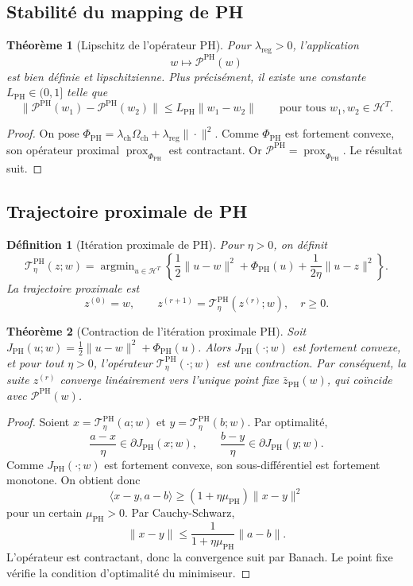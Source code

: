 \documentclass[11pt,a4paper]{article}
\newtheorem{definition}{Définition}[section]
\newtheorem{theorem}{Théorème}[section]
\DeclareMathOperator{\prox}{prox}
\DeclareMathOperator{\argmin}{argmin}
\newcommand{\Hh}{\mathcal H}
\newcommand{\Pcal}{\mathcal P}
\newcommand{\1}{\mathbf 1}
\begin{document}
\subsection{Stabilité du mapping de PH}

\begin{theorem}[Lipschitz de l'opérateur PH]
Pour \(\lambda_{\mathrm{reg}}>0\), l'application
\[
w\longmapsto \Pcal^{\mathrm{PH}}(w)
\]
est bien définie et lipschitzienne. Plus précisément, il existe une constante \(L_{\mathrm{PH}}\in(0,1]\) telle que
\[
\|\Pcal^{\mathrm{PH}}(w_1)-\Pcal^{\mathrm{PH}}(w_2)\|
\le
L_{\mathrm{PH}}\|w_1-w_2\|
\qquad
\text{pour tous } w_1,w_2\in\Hh^T.
\]
\end{theorem}

\begin{proof}
On pose \(\Phi_{\mathrm{PH}}=\lambda_{\mathrm{ch}}\Omega_{\mathrm{ch}}+\lambda_{\mathrm{reg}}\|\cdot\|^2\).  
Comme \(\Phi_{\mathrm{PH}}\) est fortement convexe, son opérateur proximal \(\prox_{\Phi_{\mathrm{PH}}}\) est contractant.  
Or \(\Pcal^{\mathrm{PH}}=\prox_{\Phi_{\mathrm{PH}}}\).  
Le résultat suit.
\end{proof}

\subsection{Trajectoire proximale de PH}

\begin{definition}[Itération proximale de PH]
Pour \(\eta>0\), on définit
\[
\mathcal T^{\mathrm{PH}}_{\eta}(z;w)
=
\argmin_{u\in\Hh^T}
\left\{
\frac12\|u-w\|^2
+\Phi_{\mathrm{PH}}(u)
+\frac{1}{2\eta}\|u-z\|^2
\right\}.
\]
La trajectoire proximale est
\[
z^{(0)}=w,
\qquad
z^{(r+1)}=\mathcal T^{\mathrm{PH}}_{\eta}(z^{(r)};w),
\quad r\ge 0.
\]
\end{definition}

\begin{theorem}[Contraction de l'itération proximale PH]
Soit \(J_{\mathrm{PH}}(u;w)=\frac12\|u-w\|^2+\Phi_{\mathrm{PH}}(u)\).  
Alors \(J_{\mathrm{PH}}(\cdot;w)\) est fortement convexe, et pour tout \(\eta>0\), l'opérateur \(\mathcal T^{\mathrm{PH}}_{\eta}(\cdot;w)\) est une contraction.  
Par conséquent, la suite \(z^{(r)}\) converge linéairement vers l'unique point fixe \(\bar z_{\mathrm{PH}}(w)\), qui coïncide avec \(\Pcal^{\mathrm{PH}}(w)\).
\end{theorem}

\begin{proof}
Soient \(x=\mathcal T^{\mathrm{PH}}_{\eta}(a;w)\) et \(y=\mathcal T^{\mathrm{PH}}_{\eta}(b;w)\).  
Par optimalité,
\[
\frac{a-x}{\eta}\in \partial J_{\mathrm{PH}}(x;w),
\qquad
\frac{b-y}{\eta}\in \partial J_{\mathrm{PH}}(y;w).
\]
Comme \(J_{\mathrm{PH}}(\cdot;w)\) est fortement convexe, son sous-différentiel est fortement monotone.  
On obtient donc
\[
\langle x-y,a-b\rangle\ge (1+\eta\mu_{\mathrm{PH}})\|x-y\|^2
\]
pour un certain \(\mu_{\mathrm{PH}}>0\).  
Par Cauchy-Schwarz,
\[
\|x-y\|\le \frac{1}{1+\eta\mu_{\mathrm{PH}}}\|a-b\|.
\]
L'opérateur est contractant, donc la convergence suit par Banach.  
Le point fixe vérifie la condition d'optimalité du minimiseur.
\end{proof}
\end{document}
